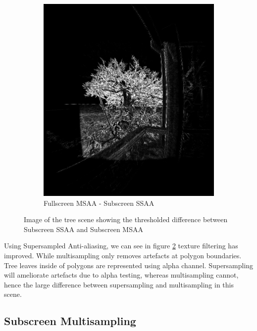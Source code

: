 \documentclass[12pt,a4paper,twoside,openright]{report}
\begin{document}
\begin{figure}
\begin{subfigure}{0.5\textwidth}
\centerline{\includegraphics[width=0.9\linewidth]{figs/difftree.png}}
\caption{Fullscreen MSAA - Subscreen SSAA}
\label{ssaatree}
\end{subfigure}
 
\caption{Image of the tree scene showing the thresholded difference between Subscreen SSAA and Subscreen MSAA}
\label{fig:supersample}
\end{figure}

Using Supersampled Anti-aliasing, we can see in figure \ref{fig:supersample} texture filtering has improved. While multisampling only removes artefacts at polygon boundaries. Tree leaves inside of polygons are represented using alpha channel. Supersampling will ameliorate artefacts due to alpha testing, whereas multisampling cannot, hence the large difference between supersampling and multisampling in this scene.

\clearpage

\subsection{Subscreen Multisampling}
\end{document}
